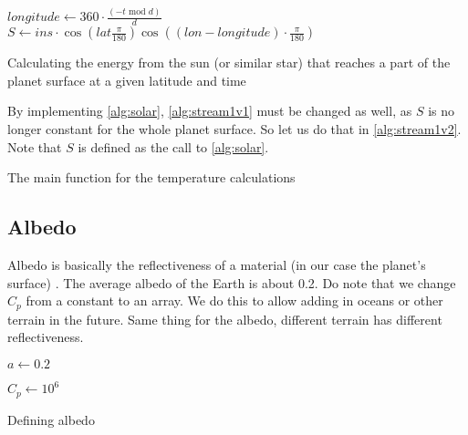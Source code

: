 \begin{algorithm}[hbt]
    \SetAlgoLined
    $longitude \leftarrow 360 \cdot \frac{(-t \text{ mod } d)}{d}$ \;
    $S \leftarrow ins \cdot \cos(lat \frac{\pi}{180}) \cos((lon - longitude) \cdot \frac{\pi}{180})$ \;
    \caption{Calculating the energy from the sun (or similar star) that reaches a part of the planet surface at a given latitude and time}
    \label{alg:solar}
\end{algorithm}

By implementing \autoref{alg:solar}, \autoref{alg:stream1v1} must be changed as well, as $S$ is no longer constant for the whole planet surface. So let us do that in \autoref{alg:stream1v2}. Note 
that $S$ is defined as the call to \autoref{alg:solar}. 
\begin{algorithm}[hbt]
    \SetAlgoLined

    \caption{The main function for the temperature calculations}
    \label{alg:stream1v2}
\end{algorithm}

\subsection{Albedo}
Albedo is basically the reflectiveness of a material (in our case the planet's surface) \cite{albedo}. The average albedo of the Earth is about 0.2. Do note that we change $C_p$ from a constant 
to an array. We do this to allow adding in oceans or other terrain in the future. Same thing for the albedo, different terrain has different reflectiveness.

\begin{algorithm}[hbt]
    $a \leftarrow 0.2$ \;

    $C_p \leftarrow 10^6$ \;
    \caption{Defining albedo}
    \label{alg:albedo}
\end{algorithm}

